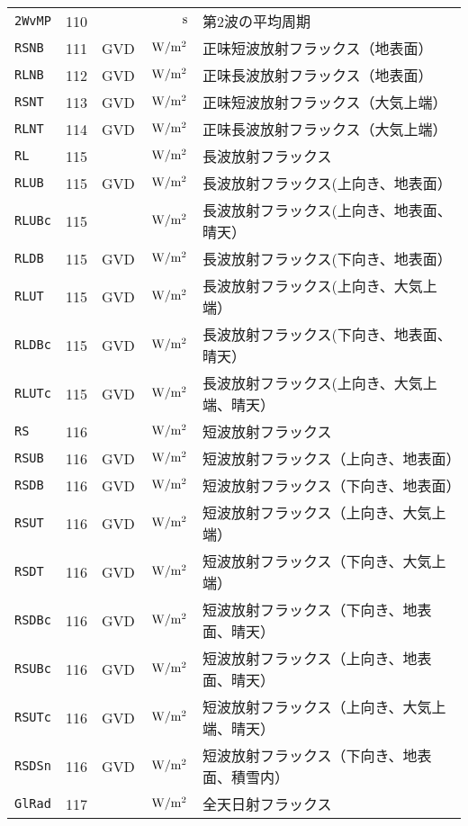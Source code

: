\begin{longtable}{l|rrrp{}}
{\tt 2WvMP} & 110 &  & ${\rm\,s}$ & 第2波の平均周期 \\
{\tt RSNB} & 111 & GVD & ${\rm\,W/m^2}$ & 正味短波放射フラックス（地表面） \\
{\tt RLNB} & 112 & GVD & ${\rm\,W/m^2}$ & 正味長波放射フラックス（地表面） \\
{\tt RSNT} & 113 & GVD & ${\rm\,W/m^2}$ & 正味短波放射フラックス（大気上端） \\
{\tt RLNT} & 114 & GVD & ${\rm\,W/m^2}$ & 正味長波放射フラックス（大気上端） \\
{\tt RL} & 115 &  & ${\rm\,W/m^2}$ & 長波放射フラックス \\
{\tt RLUB} & 115 & GVD & ${\rm\,W/m^2}$ & 長波放射フラックス(上向き、地表面） \\
{\tt RLUBc} & 115 &  & ${\rm\,W/m^2}$ & 長波放射フラックス(上向き、地表面、晴天） \\
{\tt RLDB} & 115 & GVD & ${\rm\,W/m^2}$ & 長波放射フラックス(下向き、地表面） \\
{\tt RLUT} & 115 & GVD & ${\rm\,W/m^2}$ & 長波放射フラックス(上向き、大気上端） \\
{\tt RLDBc} & 115 & GVD & ${\rm\,W/m^2}$ & 長波放射フラックス(下向き、地表面、晴天） \\
{\tt RLUTc} & 115 & GVD & ${\rm\,W/m^2}$ & 長波放射フラックス(上向き、大気上端、晴天） \\
{\tt RS} & 116 &  & ${\rm\,W/m^2}$ & 短波放射フラックス \\
{\tt RSUB} & 116 & GVD & ${\rm\,W/m^2}$ & 短波放射フラックス（上向き、地表面） \\
{\tt RSDB} & 116 & GVD & ${\rm\,W/m^2}$ & 短波放射フラックス（下向き、地表面） \\
{\tt RSUT} & 116 & GVD & ${\rm\,W/m^2}$ & 短波放射フラックス（上向き、大気上端） \\
{\tt RSDT} & 116 & GVD & ${\rm\,W/m^2}$ & 短波放射フラックス（下向き、大気上端） \\
{\tt RSDBc} & 116 & GVD & ${\rm\,W/m^2}$ & 短波放射フラックス（下向き、地表面、晴天） \\
{\tt RSUBc} & 116 & GVD & ${\rm\,W/m^2}$ & 短波放射フラックス（上向き、地表面、晴天） \\
{\tt RSUTc} & 116 & GVD & ${\rm\,W/m^2}$ & 短波放射フラックス（上向き、大気上端、晴天） \\
{\tt RSDSn} & 116 & GVD & ${\rm\,W/m^2}$ & 短波放射フラックス（下向き、地表面、積雪内） \\
{\tt GlRad} & 117 &  & ${\rm\,W/m^2}$ & 全天日射フラックス \\

\end{longtable}
